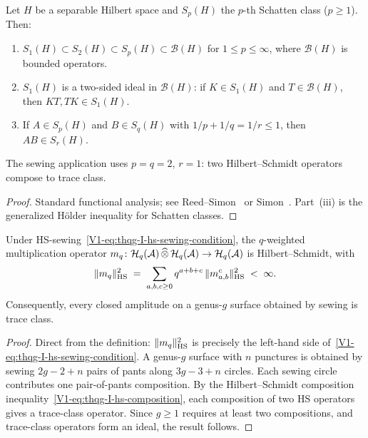 \begin{lemma}
\label{lem:thqg-I-schatten}
Let $H$ be a separable Hilbert space and $S_p(H)$ the $p$-th Schatten class ($p \geq 1$). Then:
\begin{enumerate}[label=\textup{(\roman*)}]
\item $S_1(H) \subset S_2(H) \subset S_p(H) \subset \mathcal{B}(H)$ for $1 \leq p \leq \infty$, where $\mathcal{B}(H)$ is bounded operators.
\item $S_1(H)$ is a two-sided ideal in $\mathcal{B}(H)$: if $K \in S_1(H)$ and $T \in \mathcal{B}(H)$, then $KT, TK \in S_1(H)$.
\item If $A \in S_p(H)$ and $B \in S_q(H)$ with $1/p + 1/q = 1/r \leq 1$, then $AB \in S_r(H)$.
\end{enumerate}
The sewing application uses $p = q = 2$, $r = 1$: two Hilbert--Schmidt operators compose to trace class.
\end{lemma}

\begin{proof}
Standard functional analysis; see Reed--Simon~\cite{RS78} or Simon~\cite{Simon05}. Part~(iii) is the generalized H\"older inequality for Schatten classes.
\end{proof}

\begin{proposition}
\label{prop:thqg-I-pants-hs}
Under HS-sewing~\eqref{V1-eq:thqg-I-hs-sewing-condition}, the $q$-weighted multiplication operator $m_q \colon \mathcal{H}_q(\mathcal{A}) \,\widehat{\otimes}\, \mathcal{H}_q(\mathcal{A}) \to \mathcal{H}_q(\mathcal{A})$ is Hilbert--Schmidt, with
\begin{equation}%
\|m_q\|_{\HS}^2 \;=\; \sum_{a,b,c \geq 0} q^{a+b+c}\,\|m^c_{a,b}\|_{\HS}^2 \;<\; \infty.
\end{equation}
Consequently, every closed amplitude on a genus-$g$ surface obtained by sewing is trace class.
\end{proposition}

\begin{proof}
Direct from the definition: $\|m_q\|_{\operatorname{HS}}^2$ is precisely the left-hand side of~\eqref{V1-eq:thqg-I-hs-sewing-condition}. A genus-$g$ surface with $n$ punctures is obtained by sewing $2g - 2 + n$ pairs of pants along $3g - 3 + n$ circles. Each sewing circle contributes one pair-of-pants composition. By the Hilbert--Schmidt composition inequality~\eqref{V1-eq:thqg-I-hs-composition}, each composition of two HS operators gives a trace-class operator. Since $g \geq 1$ requires at least two compositions, and trace-class operators form an ideal, the result follows.
\end{proof}

